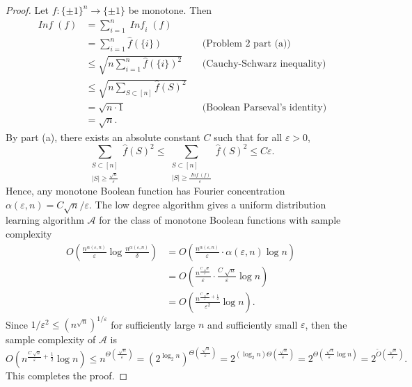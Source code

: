 \documentclass[letterpaper, reqno,11pt]{article}
\DeclareMathOperator{\Inf}{\mathit{Inf}}
\begin{document}
\begin{enumerate}
\begin{enumerate}
    \begin{proof}
      Let $f : \{ \pm 1 \}^n \to \{ \pm 1 \}$ be monotone. Then
      \begin{align*}
        \Inf(f) &= \sum_{i = 1}^n \Inf_i(f) \\
        &= \sum_{i = 1}^n \hat{f}(\{ i \}) && \text{(Problem 2 part (a))} \\
        &\leq \sqrt{n\sum_{i = 1}^n \hat{f}(\{ i \})^2} && \text{(Cauchy-Schwarz inequality)} \\
        &\leq \sqrt{n\sum_{S \subset [n]} \hat{f}(S)^2} \\
        &= \sqrt{n \cdot 1} && \text{(Boolean Parseval's identity)} \\
        &= \sqrt{n}.
      \end{align*}
      By part (a), there exists an absolute constant $C$ such that for all $\varepsilon > 0$,
      $$ \sum_{\substack{S \subset [n] \\ |S| \geq \frac{\sqrt{n}}{\varepsilon}}} \hat{f}(S)^2 \leq \sum_{\substack{S \subset [n] \\ |S| \geq \frac{\Inf(f)}{\varepsilon}}} \hat{f}(S)^2 \leq C\varepsilon. $$
      Hence, any monotone Boolean function has Fourier concentration $\alpha(\varepsilon, n) = C\sqrt{n}/\varepsilon$. The low degree algorithm gives a uniform distribution learning algorithm $\mathcal A$ for the class of monotone Boolean functions with sample complexity
      \begin{align*}
        O\left(\frac{n^{\alpha(\varepsilon, n)}}{\varepsilon} \log \frac{n^{\alpha(\varepsilon, n)}}{\delta}\right) &= O\left(\frac{n^{\alpha(\varepsilon, n)}}{\varepsilon} \cdot \alpha(\varepsilon, n) \log n\right) \\
        &= O\left(\frac{n^{\frac{C\sqrt[]{n}}{\varepsilon}}}{\varepsilon} \cdot \frac{C\sqrt[]{n}}{\varepsilon} \log n\right) \\
        &= O\left(\frac{n^{\frac{C\sqrt[]{n}}{\varepsilon} + \frac{1}{2}}}{\varepsilon^2} \log n\right).
      \end{align*}
      Since $1/\varepsilon^2 \leq (n^{\sqrt{n}})^{1/\varepsilon}$ for sufficiently large $n$ and sufficiently small $\varepsilon$, then the sample complexity of $\mathcal A$ is
      $$ O\left(n^{\frac{C\sqrt[]{n}}{\varepsilon} + \frac{1}{2}} \log n\right) \leq n^{\Theta\left(\frac{\sqrt[]{n}}{\varepsilon}\right)} = \left(2^{\log_2 n}\right)^{\Theta\left(\frac{\sqrt[]{n}}{\varepsilon}\right)} = 2^{(\log_2 n) \Theta\left(\frac{\sqrt[]{n}}{\varepsilon}\right)} = 2^{\Theta\left(\frac{\sqrt[]{n}}{\varepsilon} \log n\right)} = 2^{\widetilde{O}\left(\frac{\sqrt[]{n}}{\varepsilon}\right)}. $$
      This completes the proof.
    \end{proof}
  \end{enumerate}


\end{enumerate}
\end{document}
